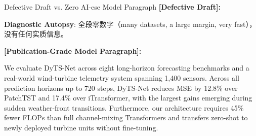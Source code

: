 \begin{ExampleBox}{Defective Draft vs. Zero AI-ese Model Paragraph}
\textbf{\color{TargetHighlight}[Defective Draft]:}\par
{}\par\vspace{4pt}
\textbf{Diagnostic Autopsy}: 全段零数字（many datasets, a large margin, very fast），没有任何实质信息。\par\vspace{6pt}
\textbf{\color{AcadNavy}[Publication-Grade Model Paragraph]:}\par
We evaluate DyTS-Net across eight long-horizon forecasting benchmarks and a real-world wind-turbine telemetry system spanning 1,400 sensors. Across all prediction horizons up to 720 steps, DyTS-Net reduces MSE by 12.8\% over PatchTST and 17.4\% over iTransformer, with the largest gains emerging during sudden weather-front transitions. Furthermore, our architecture requires 45\% fewer FLOPs than full channel-mixing Transformers and transfers zero-shot to newly deployed turbine units without fine-tuning.
\end{ExampleBox}
